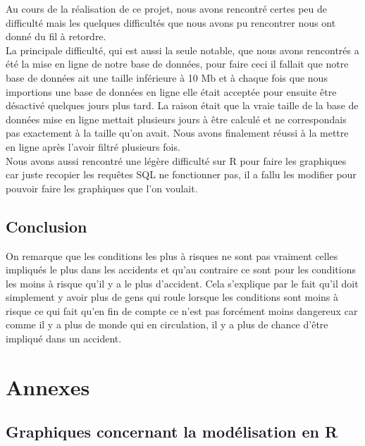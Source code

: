 \documentclass[mstat,12pt]{unswthesis}
\begin{document}
Au cours de la réalisation de ce projet, nous avons rencontré certes peu
de difficulté mais les quelques difficultés que nous avons pu rencontrer
nous ont donné du fil à retordre.\\
La principale difficulté, qui est aussi la seule notable, que nous avons
rencontrés a été la mise en ligne de notre base de données, pour faire
ceci il fallait que notre base de données ait une taille inférieure à 10
Mb et à chaque fois que nous importions une base de données en ligne
elle était acceptée pour ensuite être désactivé quelques jours plus
tard. La raison était que la vraie taille de la base de données mise en
ligne mettait plusieurs jours à être calculé et ne correspondais pas
exactement à la taille qu'on avait. Nous avons finalement réussi à la
mettre en ligne après l'avoir filtré plusieurs fois.\\
Nous avons aussi rencontré une légère difficulté sur R pour faire les
graphiques car juste recopier les requêtes SQL ne fonctionner pas, il a
fallu les modifier pour pouvoir faire les graphiques que l'on voulait.

\bigskip

\hypertarget{conclusion}{%
\section{Conclusion}\label{conclusion}}

\medskip

On remarque que les conditions les plus à risques ne sont pas vraiment
celles impliqués le plus dans les accidents et qu'au contraire ce sont
pour les conditions les moins à risque qu'il y a le plus d'accident.
Cela s'explique par le fait qu'il doit simplement y avoir plus de gens
qui roule lorsque les conditions sont moins à risque ce qui fait qu'en
fin de compte ce n'est pas forcément moins dangereux car comme il y a
plus de monde qui en circulation, il y a plus de chance d'être impliqué
dans un accident.

\hypertarget{annexes}{%
\chapter*{Annexes}\label{annexes}}

\hypertarget{graphiques-concernant-la-moduxe9lisation-en-r}{%
\section*{Graphiques concernant la modélisation en
R}\label{graphiques-concernant-la-moduxe9lisation-en-r}}
\end{document}
